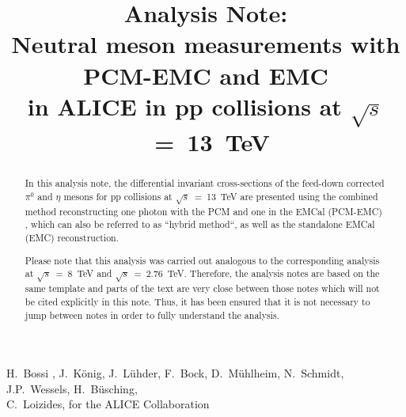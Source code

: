 \documentclass[ALICE]{ALICE_analysis_notes}
\newcommand{\s}{$\sqrt{s}$\xspace}
\newcommand{\sth}{\s~=~13~TeV\xspace}
\newcommand{\sei}{\s~=~8~TeV\xspace}
\newcommand{\stw}{\s~=~2.76~TeV\xspace}
\newcommand{\pp}{pp\xspace}
\newcommand{\PCMEMC}      {\acs{PCM}-EMC}
\newcommand{\EMC}         {EMC}
\begin{document}
\title{Analysis Note:\\Neutral meson measurements with PCM-EMC and EMC \\
in ALICE in pp collisions at $\sqrt{s}$~=~13~TeV}


\begin{Authlist}
H.~Bossi ,
J.~K\"onig,
J.~L\"uhder,
F.~Bock,
D.~M\"uhlheim,
N.~Schmidt,
J.P.~Wessels,
H.~B\"usching,\\
C.~Loizides,
for the ALICE Collaboration 
\end{Authlist}



%


\vspace{4cm}
\begin{abstract}
In this analysis note, the differential invariant cross-sections of the feed-down corrected $\pi^0$ and $\eta$ mesons for \pp collisions at \sth are presented using the combined method reconstructing one photon with the \ac{PCM} and one in the \ac{EMCal} (\PCMEMC) , which can also be referred to as ``hybrid method``, as well as the standalone EMCal (\EMC) reconstruction.

Please note that this analysis was carried out analogous to the corresponding analysis at \sei \cite{anaNoteEMC8TeV,anaNotePCMEMC8TeV} and \stw \cite{anaNotePCMEMC2760GeV,anaNoteEMC2760GeV}. Therefore, the analysis notes are based on the same template and parts of the text are very close between those notes which will not be cited explicitly in this note. Thus, it has been ensured that it is not necessary to jump between notes in order to fully understand the analysis.
\end{abstract}

\newpage

\tableofcontents






\begin{appendix}



\end{appendix}
\end{document}
